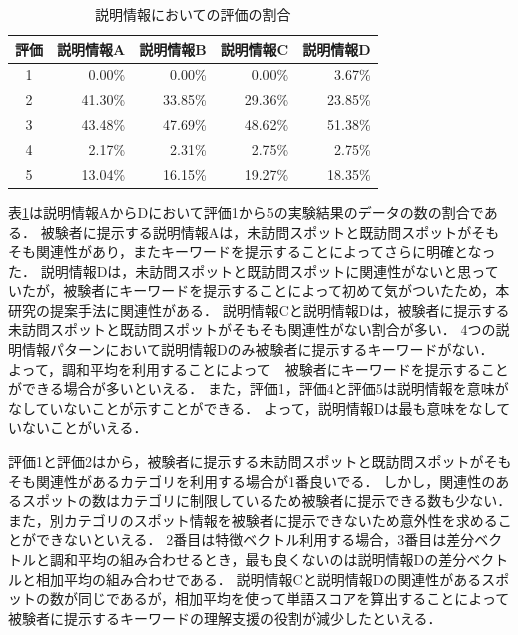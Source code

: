 \documentclass{deimj}
\begin{document}
\begin{table}[t]
  \caption{説明情報においての評価の割合}
  \label{table:説明情報においての評価の割合}
  \centering
  \begin{tabular}{c|r|r|r|r}
  \hline
  評価 & \multicolumn{1}{c|}{説明情報A} & \multicolumn{1}{c|}{説明情報B} & \multicolumn{1}{c|}{説明情報C} & \multicolumn{1}{c}{説明情報D} \\ \hline
  1  & 0.00\%                     & 0.00\%                     & 0.00\%                     & 3.67\%                    \\
  2  & 41.30\%                    & 33.85\%                    & 29.36\%                    & 23.85\%                   \\
  3  & 43.48\%                    & 47.69\%                    & 48.62\%                    & 51.38\%                   \\
  4  & 2.17\%                     & 2.31\%                     & 2.75\%                     & 2.75\%                    \\
  5  & 13.04\%                    & 16.15\%                    & 19.27\%                    & 18.35\%                   \\ \hline
  \end{tabular}
\end{table}

表\ref{table:説明情報においての評価の割合}は説明情報AからDにおいて評価1から5の実験結果のデータの数の割合である．
被験者に提示する説明情報Aは，未訪問スポットと既訪問スポットがそもそも関連性があり，またキーワードを提示することによってさらに明確となった．
説明情報Dは，未訪問スポットと既訪問スポットに関連性がないと思っていたが，被験者にキーワードを提示することによって初めて気がついたため，本研究の提案手法に関連性がある．
説明情報Cと説明情報Dは，被験者に提示する未訪問スポットと既訪問スポットがそもそも関連性がない割合が多い．
4つの説明情報パターンにおいて説明情報Dのみ被験者に提示するキーワードがない．
よって，調和平均を利用することによって　被験者にキーワードを提示することができる場合が多いといえる．
また，評価1，評価4と評価5は説明情報を意味がなしていないことが示すことができる．
よって，説明情報Dは最も意味をなしていないことがいえる．

評価1と評価2はから，被験者に提示する未訪問スポットと既訪問スポットがそもそも関連性があるカテゴリを利用する場合が1番良いでる．
しかし，関連性のあるスポットの数はカテゴリに制限しているため被験者に提示できる数も少ない．
また，別カテゴリのスポット情報を被験者に提示できないため意外性を求めることができないといえる．
2番目は特徴ベクトル利用する場合，3番目は差分ベクトルと調和平均の組み合わせるとき，最も良くないのは説明情報Dの差分ベクトルと相加平均の組み合わせである．
説明情報Cと説明情報Dの関連性があるスポットの数が同じであるが，相加平均を使って単語スコアを算出することによって被験者に提示するキーワードの理解支援の役割が減少したといえる．
\end{document}
